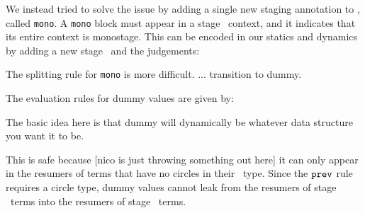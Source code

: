We instead tried to solve the issue by adding a single new staging annotation to \lang, called \texttt{mono}.  
A \texttt{mono} block must appear in a stage \bbone\ context, and it indicates that its entire context is monostage.
This can be encoded in our statics and dynamics by adding a new stage \bbmono\ and the judgements:

The splitting rule for \texttt{mono} is more difficult.
...
transition to dummy.

The evaluation rules for dummy values are given by:

The basic idea here is that dummy will dynamically be whatever data structure you want it to be.

This is safe because [nico is just throwing something out here] 
it can only appear in the resumers of terms that have no circles in their \lang\ type.
Since the ${\tt prev}$ rule requires a circle type, dummy values cannot leak from
the resumers of stage \bbone\ terms into the resumers of stage \bbtwo\ terms.


